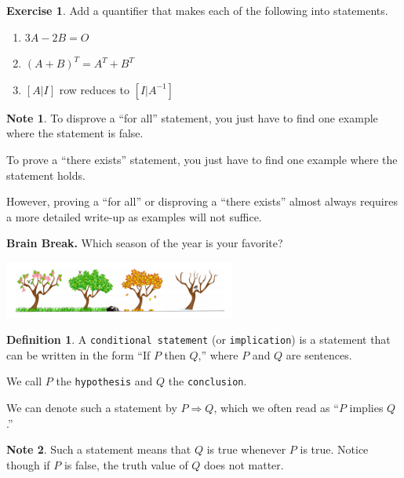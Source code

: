 \documentclass[handout]{beamer}
\newcommand{\fn}{\insertframenumber}
\theoremstyle{definition}
\newtheorem{exercise}{Exercise}
\newtheorem*{defn}{Definition}
\newtheorem*{nb}{Note}
\renewcommand{\emph}[1]{{\color{blue}\texttt{#1}}}
\begin{document}
\begin{frame}{\fn}
	\begin{exercise}
		Add a quantifier that makes each of the following into statements.
		\begin{enumerate}[label=(\alph*)]
			\item $3A-2B=O$
			\item $(A+B)^{T}=A^T+B^T$
			\item $[A|I]$ row reduces to $[I|A^{-1}]$
		\end{enumerate}
	\end{exercise}
	\begin{nb}
		To disprove a ``for all'' statement, you just have to find one example where the statement is false.
		
		To prove a ``there exists'' statement, you just have to find one example where the statement holds.
		
		However, proving a ``for all'' or disproving a ``there exists'' almost always requires a more detailed write-up as examples will not suffice.
	\end{nb}
\end{frame}
\begin{frame}{\fn}
\begin{block}{\textbf{Brain Break.}}
	Which season of the year is your favorite?
	\begin{center}
		\includegraphics[width=3in]{../images/seasons}
	\end{center}
\end{block}
\end{frame}
\begin{frame}{\fn}
	\begin{defn}
		A \emph{conditional statement} (or \emph{implication}) is a statement that can be written in the form ``If $P$ then $Q$,'' where $P$ and $Q$ are sentences. 
		
		We call $P$ the \emph{hypothesis} and $Q$ the \emph{conclusion}.
		
		We can denote such a statement by $P\Rightarrow Q$, which we often read as ``$P$ implies $Q$.''
	\end{defn}
	\begin{nb}
		Such a statement means that $Q$ is true whenever $P$ is true.  
		Notice though if $P$ is false, the truth value of $Q$ does not matter.
	\end{nb}
\end{frame}
\end{document}
